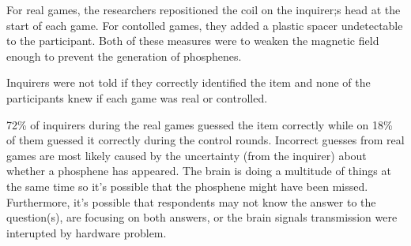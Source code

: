 \documentclass[12pt]{article}
\begin{document}
For real games, the researchers repositioned the coil on the inquirer;s head at the start of each game. For contolled games, they added a plastic spacer undetectable to the participant. Both of these measures were to weaken the magnetic field enough to prevent the generation of phosphenes.

Inquirers were not told if they correctly identified the item and none of the participants knew if each game was real or controlled.

72\% of inquirers during the real games guessed the item correctly while on 18\% of them guessed it correctly during the control rounds. Incorrect guesses from real games are most likely caused by the uncertainty (from the inquirer) about whether a phosphene has appeared. The brain is doing a multitude of things at the same time so it's possible that the phosphene might have been missed. Furthermore, it's possible that respondents may not know the answer to the question(s), are focusing on both answers, or the brain signals transmission were interupted by hardware problem.
\end{document}
